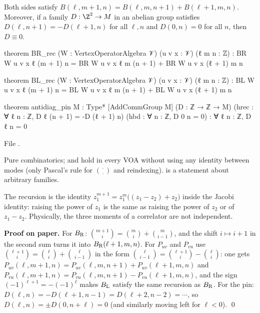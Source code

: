 \begin{lemma}\label{l03:lem:pascal}
Both sides satisfy $B(\ell,m+1,n) = B(\ell,m,n+1) + B(\ell+1,m,n)$. Moreover, if a family
$D:\Z^2\to M$ in an abelian group satisfies $D(\ell,n+1) = -D(\ell+1,n)$ for all $\ell,n$ and $D(0,n) = 0$
for all $n$, then $D\equiv0$.
\end{lemma}
\begin{leancode}
theorem BR_rec (W : VertexOperatorAlgebra 𝒱) (u v x : 𝒱) (ℓ m n : ℤ) :
    BR W u v x ℓ (m + 1) n = BR W u v x ℓ m (n + 1) + BR W u v x (ℓ + 1) m n

theorem BL_rec (W : VertexOperatorAlgebra 𝒱) (u v x : 𝒱) (ℓ m n : ℤ) :
    BL W u v x ℓ (m + 1) n = BL W u v x ℓ m (n + 1) + BL W u v x (ℓ + 1) m n

theorem antidiag_pin {M : Type*} [AddCommGroup M] (D : ℤ → ℤ → M)
    (hrec : ∀ ℓ n : ℤ, D ℓ (n + 1) = -D (ℓ + 1) n) (hbd : ∀ n : ℤ, D 0 n = 0) :
    ∀ ℓ n : ℤ, D ℓ n = 0
\end{leancode}
File .

\begin{dictionary}
Pure combinatorics;  and  hold in every VOA without using any identity
between modes (only Pascal's rule for $\binom\cdot\cdot$ and reindexing).  is a
statement about arbitrary families.
\end{dictionary}

\begin{physics}
The recursion is the identity $z_1^{m+1} = z_1^m\big((z_1-z_2)+z_2\big)$ inside the Jacobi identity:
raising the power of $z_1$ is the same as raising the power of $z_2$ or of $z_1-z_2$. Physically, the
three moments of a correlator are not independent.
\end{physics}

\textbf{Proof on paper.} For $B_{\mathrm R}$: $\binom{m+1}i = \binom mi + \binom m{i-1}$, and the shift
$i\mapsto i+1$ in the second sum turns it into $B_{\mathrm R}(\ell+1,m,n)$. For $P_{uv}$ and $P_{vu}$ use
$\binom{\ell+1}{i} = \binom\ell i+\binom\ell{i-1}$ in the form $\binom\ell{i-1} = \binom{\ell+1}i - \binom\ell i$:
one gets $P_{uv}(\ell,m+1,n) = P_{uv}(\ell,m,n+1) + P_{uv}(\ell+1,m,n)$ and
$P_{vu}(\ell,m+1,n) = P_{vu}(\ell,m,n+1) - P_{vu}(\ell+1,m,n)$, and the sign $(-1)^{\ell+1} = -(-1)^\ell$
makes $B_{\mathrm L}$ satisfy the same recursion as $B_{\mathrm R}$. For the pin: $D(\ell,n) = -D(\ell+1,n-1) =
D(\ell+2,n-2) = \cdots$, so $D(\ell,n) = \pm D(0,n+\ell) = 0$ (and similarly moving left for $\ell<0$). \qed

